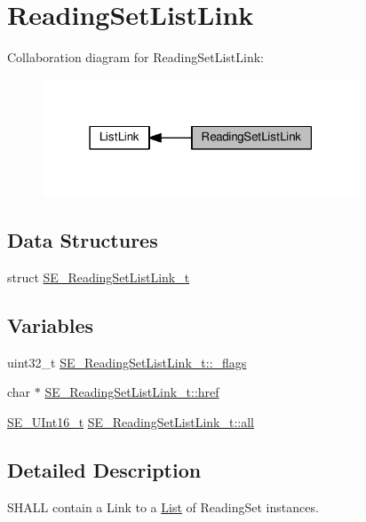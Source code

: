 \hypertarget{group__ReadingSetListLink}{}\section{Reading\+Set\+List\+Link}
\label{group__ReadingSetListLink}
Collaboration diagram for Reading\+Set\+List\+Link\+:\nopagebreak
\begin{figure}[H]
\begin{center}
\leavevmode
\includegraphics[width=267pt]{group__ReadingSetListLink}
\end{center}
\end{figure}
\subsection*{Data Structures}
\begin{DoxyCompactItemize}
\item 
struct \hyperlink{structSE__ReadingSetListLink__t}{S\+E\+\_\+\+Reading\+Set\+List\+Link\+\_\+t}
\end{DoxyCompactItemize}
\subsection*{Variables}
\begin{DoxyCompactItemize}
\item 
uint32\+\_\+t \hyperlink{group__ReadingSetListLink_ga3d172a0c6b5174867353b4f36a430f0f}{S\+E\+\_\+\+Reading\+Set\+List\+Link\+\_\+t\+::\+\_\+flags}
\item 
char $\ast$ \hyperlink{group__ReadingSetListLink_ga0ae032cf6c2098b273bc37628b88ac92}{S\+E\+\_\+\+Reading\+Set\+List\+Link\+\_\+t\+::href}
\item 
\hyperlink{group__UInt16_gac68d541f189538bfd30cfaa712d20d29}{S\+E\+\_\+\+U\+Int16\+\_\+t} \hyperlink{group__ReadingSetListLink_ga291434e7c08011bebfd4f6525890f6d6}{S\+E\+\_\+\+Reading\+Set\+List\+Link\+\_\+t\+::all}
\end{DoxyCompactItemize}


\subsection{Detailed Description}
S\+H\+A\+LL contain a Link to a \hyperlink{structList}{List} of Reading\+Set instances. 

